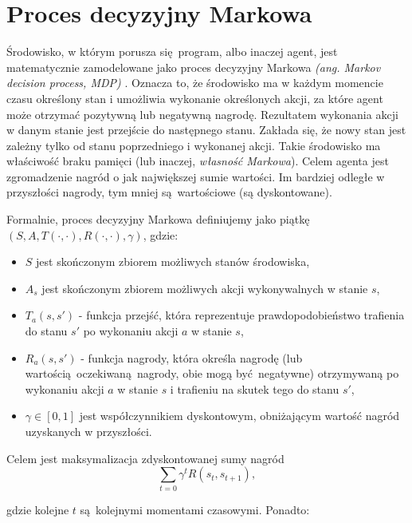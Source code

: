 \section{Proces decyzyjny Markowa}\label{mdp}

Środowisko, w którym porusza się program, albo inaczej agent, jest matematycznie zamodelowane jako proces decyzyjny Markowa \textit{(ang. Markov decision process, MDP)} \cite{bellman1954}. Oznacza to, że środowisko ma w każdym momencie czasu określony stan i umożliwia wykonanie określonych akcji, za które agent może otrzymać pozytywną lub negatywną nagrodę. Rezultatem wykonania akcji w danym stanie jest przejście do następnego stanu. Zakłada się, że nowy stan jest zależny tylko od stanu poprzedniego i wykonanej akcji. Takie środowisko ma właściwość braku pamięci (lub inaczej, \textit{własność Markowa}). Celem agenta jest zgromadzenie nagród o jak największej sumie wartości. Im bardziej odległe w przyszłości nagrody, tym mniej są wartościowe (są dyskontowane).

\vspace{5mm}

Formalnie, proces decyzyjny Markowa definiujemy jako piątkę $(S,A,T(\cdot,\cdot),R(\cdot,\cdot),\gamma)$, gdzie:
\begin{itemize}
\item $S$ jest skończonym zbiorem możliwych stanów środowiska,
\item $A_s$ jest skończonym zbiorem możliwych akcji wykonywalnych w stanie $s$,
\item $T_a(s,s')$ - funkcja przejść, która reprezentuje prawdopodobieństwo trafienia do stanu $s'$ po wykonaniu akcji $a$ w stanie $s$,
\item $R_a(s,s')$ - funkcja nagrody, która określa nagrodę (lub wartością oczekiwaną nagrody, obie mogą być negatywne) otrzymywaną po wykonaniu akcji $a$ w stanie $s$ i trafieniu na skutek tego do stanu $s'$,
\item $\gamma \in [0,1]$ jest współczynnikiem dyskontowym, obniżającym wartość nagród uzyskanych w przyszłości.
\end{itemize}

Celem jest maksymalizacja zdyskontowanej sumy nagród $$\sum_{t=0}{\gamma^t R(s_t,s_{t+1})},$$

gdzie kolejne $t$ są kolejnymi momentami czasowymi. Ponadto:

